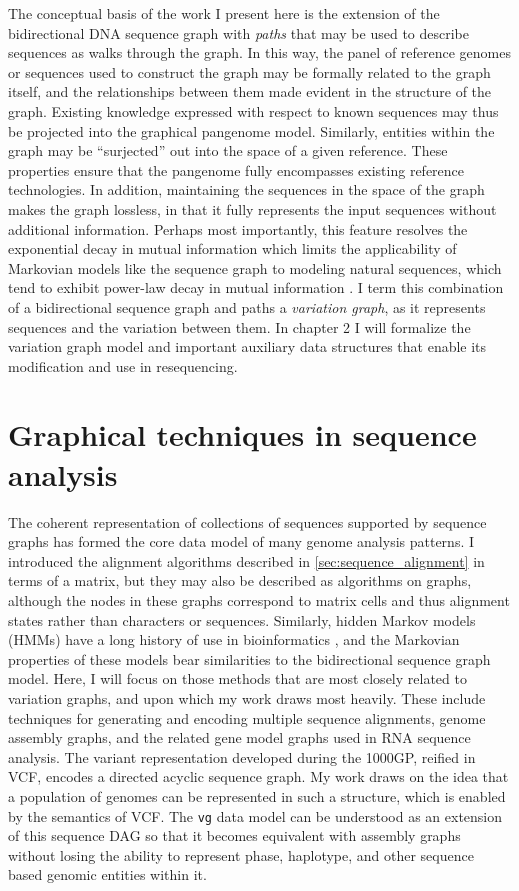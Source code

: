 The conceptual basis of the work I present here is the extension of the bidirectional DNA sequence graph with \emph{paths} that may be used to describe sequences as walks through the graph.
In this way, the panel of reference genomes or sequences used to construct the graph may be formally related to the graph itself, and the relationships between them made evident in the structure of the graph.
Existing knowledge expressed with respect to known sequences may thus be projected into the graphical pangenome model.
Similarly, entities within the graph may be ``surjected'' out into the space of a given reference.
These properties ensure that the pangenome fully encompasses existing reference technologies.
In addition, maintaining the sequences in the space of the graph makes the graph lossless, in that it fully represents the input sequences without additional information.
Perhaps most importantly, this feature resolves the exponential decay in mutual information which limits the applicability of Markovian models like the sequence graph to modeling natural sequences, which tend to exhibit power-law decay in mutual information \cite{lin2017critical}.
I term this combination of a bidirectional sequence graph and paths a \emph{variation graph}, as it represents sequences and the variation between them.
In chapter 2 I will formalize the variation graph model and important auxiliary data structures that enable its modification and use in resequencing.

\section{Graphical techniques in sequence analysis}

The coherent representation of collections of sequences supported by sequence graphs has formed the core data model of many genome analysis patterns.
I introduced the alignment algorithms described in \ref{sec:sequence_alignment} in terms of a matrix, but they may also be described as algorithms on graphs, although the nodes in these graphs correspond to matrix cells and thus alignment states rather than characters or sequences.
Similarly, hidden Markov models (HMMs) have a long history of use in bioinformatics \cite{durbin1998biological}, and the Markovian properties of these models bear similarities to the bidirectional sequence graph model.
Here, I will focus on those methods that are most closely related to variation graphs, and upon which my work draws most heavily.
These include techniques for generating and encoding multiple sequence alignments, genome assembly graphs, and the related gene model graphs used in RNA sequence analysis.
The variant representation developed during the 1000GP, reified in VCF, encodes a directed acyclic sequence graph.
My work draws on the idea that a population of genomes can be represented in such a structure, which is enabled by the semantics of VCF.
The {\tt vg} data model can be understood as an extension of this sequence DAG so that it becomes equivalent with assembly graphs without losing the ability to represent phase, haplotype, and other sequence based genomic entities within it.

